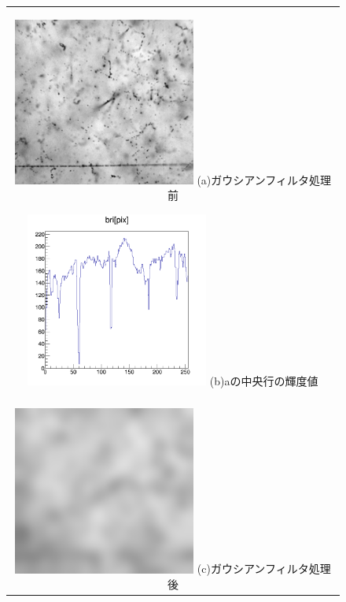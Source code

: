 \documentclass[12pt,a4paper]{jarticle}
\begin{document}
\begin{figure}[htbp]
  \centering
      \begin{tabular}{c}
        \begin{minipage}{0.5\hsize}
          \centering
            \includegraphics[clip, width=60mm]{cont.png}
            \hspace{1.6cm} (a)ガウシアンフィルタ処理前
        \end{minipage}
        
        \begin{minipage}{0.5\hsize}
          \centering
            \includegraphics[clip, width=60mm]{cont_hist2.png}
            \hspace{1.6cm} (b)aの中央行の輝度値
        \end{minipage}
        \\
        \\
        \begin{minipage}{0.5\hsize}
          \centering
              \includegraphics[clip, width=60mm]{gau2.png}
              \hspace{1.6cm} (c)ガウシアンフィルタ処理後
          \end{minipage}
          

\end{tabular}
\end{figure}
\end{document}
